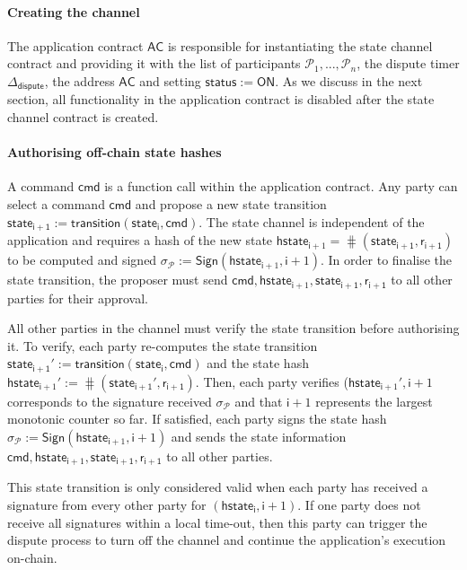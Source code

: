 \documentclass{article}
\newcommand{\chanstatus}{\mathsf{status}}
\newcommand{\chanon}{\mathsf{ON}}
\newcommand{\cmd}{\mathsf{cmd}}
\newcommand{\hstatei}{\mathsf{hstate}_{\monotoniccounter}}
\newcommand{\hstateplus}{\ensuremath{\mathsf{hstate}_{\monotoniccounter+1}}}
\newcommand{\monotoniccounter}{\mathsf{i}}
\newcommand{\stateinfoi}{\mathsf{state}_{\mathsf{i}}}
\newcommand{\stateinfoplus}{\mathsf{state}_{\mathsf{i+1}}}
\newcommand{\participant}{\mathcal{P}}
\newcommand{\ranplus}{\mathsf{r}_{\mathsf{i+1}}}
\newcommand{\sign}{\mathsf{Sign}}
\newcommand{\appcontract}{\mathsf{AC}}
\newcommand{\timerdispute}{\mathsf{\Delta}_{\mathsf{dispute}}}
\begin{document}
\paragraph{Creating the channel} 

The application contract $\appcontract$ is responsible for instantiating the state channel contract and providing it with the list of participants $\participant_{1},...,\participant_{n}$, the dispute timer $\timerdispute$, the address $\appcontract$ and setting $\chanstatus := \chanon$. 
As we discuss in the next section, all functionality in the application contract is disabled after the state channel contract is created. 

\paragraph{Authorising off-chain state hashes}
A command $\cmd$ is a function call within the application contract.
Any party can select a command $\cmd$ and propose a new state transition $\stateinfoplus := \mathsf{transition}(\stateinfoi, \cmd)$.
The state channel is independent of the application and requires a hash of the new state  $\hstateplus = \hash(\stateinfoplus, \ranplus)$ to be computed and signed  $\sigma_{\participant} := \sign(\hstateplus,\monotoniccounter+1)$.
In order to finalise the state transition, the proposer  must send $\cmd,\hstateplus, \stateinfoplus, \ranplus$ to all other parties for their approval.

All other parties in the channel must verify the state transition before authorising it. 
To verify, each party re-computes the state transition $\stateinfoplus' := \mathsf{transition}(\stateinfoi, \cmd)$ and the state hash $\hstateplus' := \hash(\stateinfoplus', \ranplus)$.
Then, each party verifies  ($\hstateplus', \monotoniccounter+1$ corresponds to the signature received $\sigma_{\participant}$ and that $\monotoniccounter+1$ represents the largest monotonic counter so far. 
If satisfied, each party signs the state hash  $\sigma_{\participant} := \sign(\hstateplus,\monotoniccounter+1)$ and sends the state information  $\cmd,\hstateplus, \stateinfoplus, \ranplus$ to all other parties. 

This state transition is only considered valid when each party has received a signature from every other party for $(\hstatei, \monotoniccounter+1)$. If one party does not receive all signatures within a local time-out, then this party can trigger the dispute process to turn off the channel and continue the application's execution on-chain. 
\end{document}
